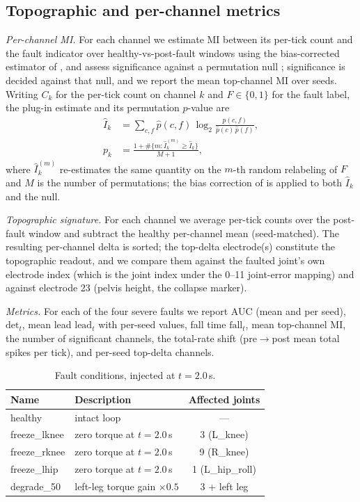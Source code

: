 \subsection{Topographic and per-channel metrics}

\emph{Per-channel MI.} For each channel we estimate MI between its per-tick
count and the fault indicator over healthy-vs-post-fault windows using the
bias-corrected estimator of \cite{kraskov2004,panzeri2007},
and assess significance against a
permutation null \cite{theiler1992,ernst2004}; significance is decided against that
null, and we report the mean top-channel MI over seeds. Writing $C_k$ for the
per-tick count on channel $k$ and $F \in \{0,1\}$ for the fault label, the
plug-in estimate and its permutation $p$-value are
\begin{equation}
\begin{aligned}
\hat I_k &= \sum_{c,f} \hat p(c,f)\,\log_2
\frac{\hat p(c,f)}{\hat p(c)\,\hat p(f)},\\
p_k &= \frac{1 + \#\{m : \hat I_k^{(m)} \ge \hat I_k\}}{M+1},
\end{aligned}
\end{equation}
where $\hat I_k^{(m)}$ re-estimates the same quantity on the $m$-th random
relabeling of $F$ and $M$ is the number of permutations; the bias correction of
\cite{panzeri2007} is applied to both $\hat I_k$ and the null.

\emph{Topographic signature.} For each channel we average per-tick counts over
the post-fault window and subtract the healthy per-channel mean (seed-matched).
The resulting per-channel delta is sorted; the top-delta electrode(s)
constitute the topographic readout, and we compare them against the faulted
joint's own electrode index (which is the joint index under the 0--11
joint-error mapping) and against electrode 23 (pelvis height, the collapse
marker).

\emph{Metrics.} For each of the four severe faults we report AUC (mean and per
seed), $\mathrm{det}_t$, mean lead $\mathrm{lead}_t$ with per-seed values, fall
time $\mathrm{fall}_t$, mean top-channel MI, the number of significant
channels, the total-rate shift (pre$\rightarrow$post mean total spikes per
tick), and per-seed top-delta channels.

\begin{table}[t]
\caption{Fault conditions, injected at $t = 2.0$\,s.}
\label{tab:faults}
\centering
\begin{tabular}{@{}llc@{}}
\toprule
Name & Description & Affected joints \\
\midrule
healthy & intact loop & --- \\
freeze\_lknee & zero torque at $t=2.0$\,s & 3 (L\_knee) \\
freeze\_rknee & zero torque at $t=2.0$\,s & 9 (R\_knee) \\
freeze\_lhip & zero torque at $t=2.0$\,s & 1 (L\_hip\_roll) \\
degrade\_50 & left-leg torque gain $\times 0.5$ & 3 + left leg \\
\bottomrule
\end{tabular}
\end{table}

